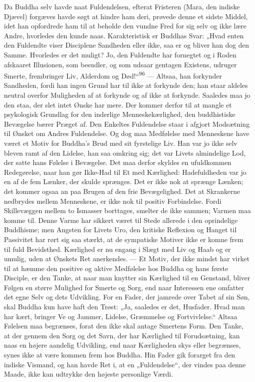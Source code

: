 \documentclass[12pt,a4paper,openany]{book}
\newcommand{\opage}[1]{\marginnote{\footnotesize\textit{[#1]}}}
\begin{document}
Da Buddha selv havde naat Fuldendelsen, efterat Fristeren (Mara, den
indiske Djævel) forgæves havde søgt at hindre ham deri, prøvede denne et
sidste Middel, idet han opfordrede ham til at beholde den vundne Fred
for sig selv og ikke lære Andre, hvorledes den kunde naas.
Karakteristisk er Buddhas Svar: „Hvad enten den Fuldendte viser
Disciplene Sandheden eller ikke, saa er og bliver han dog den Samme.
Hvorledes er det muligt? Jo, den Fuldendte har fornegtet og i Roden
afskaaret Illusionen, som besudler, og som udsaar gentagen Existens,
udruger Smerte, frembringer Liv, Alderdom og Død!“\textsuperscript{96}
--- Altsaa, han forkynder Sandheden, fordi han ingen Grund har til ikke
at forkynde den; han staar aldeles neutral overfor Muligheden af at
forkynde og af ikke at forkynde. Saaledes maa jo den staa, der slet
intet Ønske har mere. Der kommer derfor til at mangle et psykologisk
Grundlag for den inderlige Menneskekærlighed, den buddhistiske Bevægelse
bærer Præget af. Den Enkeltes Fuldendelse staar i afgjort Modsætning til
Ønsket om Andres Fuldendelse. Og dog maa Medfølelse med Menneskene have
været et Motiv for Buddha’s Brud med sit fyrstelige Liv. Han var jo ikke
selv bleven ramt af den Lidelse, han saa omkring sig; det var Livets
almindelige Lod, der satte hans Følelse i Bevægelse. Det maa derfor
skyldes en ufuldkommen Redegørelse, naar han gør Ikke-Had til Et med
Kærlighed: Hadefuldheden var jo en af de fem Lænker, der skulde
sprænges. Det er ikke nok at sprænge
\opage{197}Lænken; det kommer ogsaa an paa Brugen af den frie
Bevægelighed. Det at Skrankerne nedbrydes mellem Menneskene, er ikke nok
til positiv Forbindelse. Fordi Skillevæggen mellem to Ismasser
borttages, smelter de ikke sammen; Varmen maa komme til. Denne Varme har
sikkert været til Stede allerede i den oprindelige Buddhisme; men
Angsten for Livets Uro, den kritiske Reflexion og Hanget til Passivitet
har rørt sig saa stærkt, at de sympatiske Motiver ikke er komne frem til
fuld Bevidsthed. Kærlighed er nu engang i Slægt med Liv og Haab og er
umulig, uden at Ønskets Ret anerkendes. --- Et Motiv, der ikke mindst
har virket til at hæmme den positive og aktive Medfølelse hos Buddha og
hans første Disciple, er den Tanke, at naar man knytter sin Kærlighed
til en Genstand, bliver Følgen en større Mulighed for Smerte og Sorg,
end naar Interessen ene omfatter det egne Selv og dets Udvikling. For en
Fader, der jamrede over Tabet af sin Søn, skal Buddha kun have haft den
Trøst: „Ja, saaledes er det, Husfader. Hvad man har kært, bringer Ve og
Jammer, Lidelse, Græmmelse og Fortvivlelse.“ Altsaa Følelsen maa
begrænses, forat den ikke skal antage Smertens Form. Den Tanke, at der
gennem den Sorg og det Savn, der har Kærlighed til Forudsætning, kan
naas en højere aandelig Udvikling, end naar Kærligheden skys eller
begrænses, synes ikke at være kommen frem hos Buddha. Hin Fader gik
forarget fra den indiske Vismand, og han havde Ret i, at en
„Fuldendelse“, der vindes paa denne Maade, ikke kan udtrykke den højeste
personlige Værdi.
\end{document}
